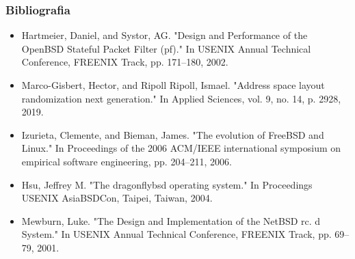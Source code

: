 \documentclass[9pt,xcolor=table]{beamer}
\begin{document}
\begin{frame}
  \frametitle{Bibliografia}

  \begin{itemize}
    \item Hartmeier, Daniel, and Systor, AG. "Design and Performance of the OpenBSD Stateful Packet Filter (pf)." In USENIX Annual Technical Conference, FREENIX Track, pp. 171--180, 2002.
    \item Marco-Gisbert, Hector, and Ripoll Ripoll, Ismael. "Address space layout randomization next generation." In Applied Sciences, vol. 9, no. 14, p. 2928, 2019.
    \item Izurieta, Clemente, and Bieman, James. "The evolution of FreeBSD and Linux." In Proceedings of the 2006 ACM/IEEE international symposium on empirical software engineering, pp. 204--211, 2006.
    \item Hsu, Jeffrey M. "The dragonflybsd operating system." In Proceedings USENIX AsiaBSDCon, Taipei, Taiwan, 2004.
    \item Mewburn, Luke. "The Design and Implementation of the NetBSD rc. d System." In USENIX Annual Technical Conference, FREENIX Track, pp. 69--79, 2001.
  \end{itemize}
\end{frame}
\end{document}
